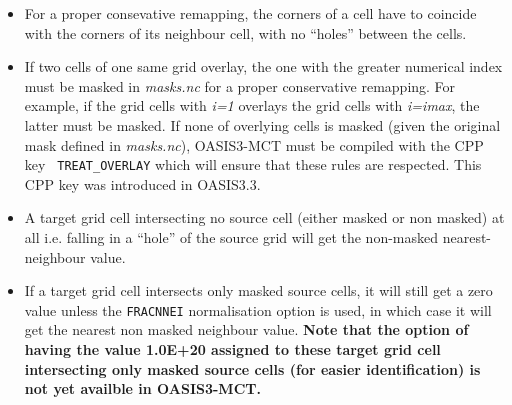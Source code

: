 \begin{itemize}
\begin{itemize}
  \item For a proper consevative remapping, the corners of a cell have
    to coincide with the corners of its neighbour cell, with no
    ``holes'' between the cells.
  
  \item If two cells of one same grid overlay, the one with
    the greater numerical index must be masked in {\it
      masks.nc} for a proper conservative remapping.  For example, 
     if the grid cells with {\it i=1} overlays the grid cells with {\it i=imax}, the latter must
    be masked.  If none of overlying cells is masked (given the
    original mask defined in {\it
      masks.nc}), OASIS3-MCT must be compiled with the CPP key {\tt
      TREAT\_OVERLAY} which will ensure that these rules are
    respected. This CPP key was introduced in OASIS3.3.
      
  \item A target grid cell intersecting no source cell (either masked
    or non masked) at all i.e. falling in a ``hole'' of the source
    grid will get the non-masked nearest-neighbour value.
    
  \item If a target grid cell intersects only masked source cells, it
    will still get a zero value unless the {\tt FRACNNEI}
    normalisation option is used, in which case it will get the
    nearest non masked neighbour value. {\bf Note that the option of
      having the value 1.0E+20 assigned to these target grid cell
      intersecting only masked source cells (for easier
      identification) is not yet availble in OASIS3-MCT.}
   

    
   
  \end{itemize}


\end{itemize}
